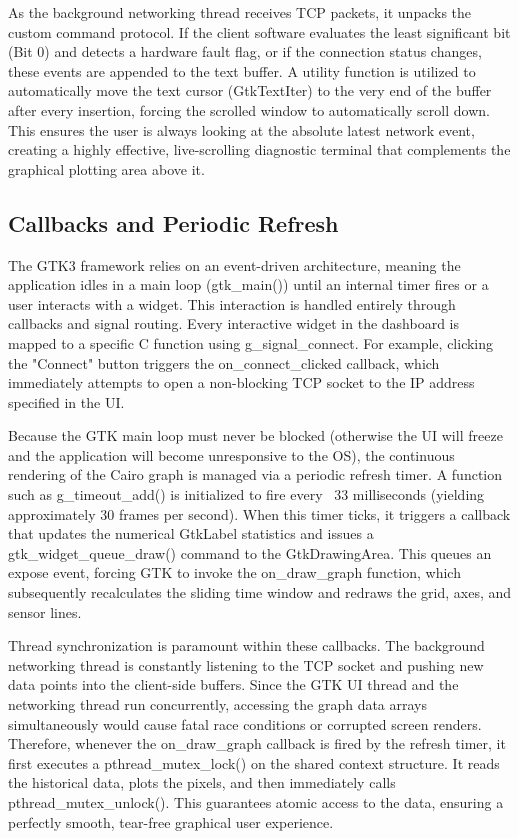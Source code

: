 As the background networking thread receives TCP packets, it unpacks the custom command protocol. If the client software evaluates the least significant bit (Bit 0) and detects a hardware fault flag, or if the connection status changes, these events are appended to the text buffer. A utility function is utilized to automatically move the text cursor (GtkTextIter) to the very end of the buffer after every insertion, forcing the scrolled window to automatically scroll down. This ensures the user is always looking at the absolute latest network event, creating a highly effective, live-scrolling diagnostic terminal that complements the graphical plotting area above it.


\subsection{Callbacks and Periodic Refresh}
The GTK3 framework relies on an event-driven architecture, meaning the application idles in a main loop (gtk\_main()) until an internal timer fires or a user interacts with a widget. This interaction is handled entirely through callbacks and signal routing. Every interactive widget in the dashboard is mapped to a specific C function using g\_signal\_connect. For example, clicking the "Connect" button triggers the on\_connect\_clicked callback, which immediately attempts to open a non-blocking TCP socket to the IP address specified in the UI.

Because the GTK main loop must never be blocked (otherwise the UI will freeze and the application will become unresponsive to the OS), the continuous rendering of the Cairo graph is managed via a periodic refresh timer. A function such as g\_timeout\_add() is initialized to fire every ~33 milliseconds (yielding approximately 30 frames per second). When this timer ticks, it triggers a callback that updates the numerical GtkLabel statistics and issues a gtk\_widget\_queue\_draw() command to the GtkDrawingArea. This queues an expose event, forcing GTK to invoke the on\_draw\_graph function, which subsequently recalculates the sliding time window and redraws the grid, axes, and sensor lines.

Thread synchronization is paramount within these callbacks. The background networking thread is constantly listening to the TCP socket and pushing new data points into the client-side buffers. Since the GTK UI thread and the networking thread run concurrently, accessing the graph data arrays simultaneously would cause fatal race conditions or corrupted screen renders. Therefore, whenever the on\_draw\_graph callback is fired by the refresh timer, it first executes a pthread\_mutex\_lock() on the shared context structure. It reads the historical data, plots the pixels, and then immediately calls pthread\_mutex\_unlock(). This guarantees atomic access to the data, ensuring a perfectly smooth, tear-free graphical user experience.

